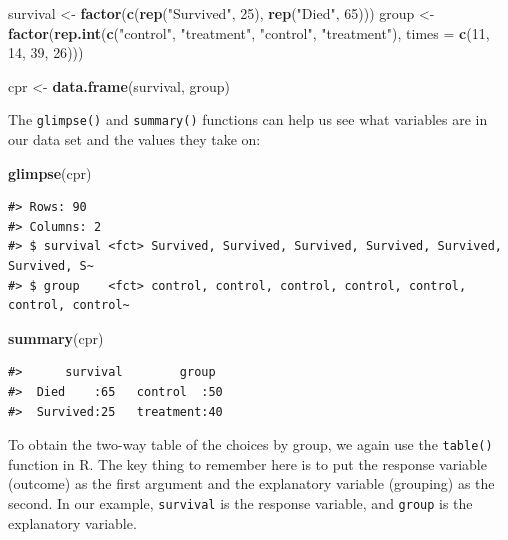 \documentclass[
  10pt,
  openany]{book}
\newenvironment{Shaded}{\begin{snugshade}}{\end{snugshade}}
\newcommand{\AttributeTok}[1]{\textcolor[rgb]{0.13,0.29,0.53}{#1}}
\newcommand{\DecValTok}[1]{\textcolor[rgb]{0.00,0.00,0.81}{#1}}
\newcommand{\FunctionTok}[1]{\textcolor[rgb]{0.13,0.29,0.53}{\textbf{#1}}}
\newcommand{\NormalTok}[1]{#1}
\newcommand{\OtherTok}[1]{\textcolor[rgb]{0.56,0.35,0.01}{#1}}
\newcommand{\StringTok}[1]{\textcolor[rgb]{0.31,0.60,0.02}{#1}}
\theoremstyle{definition}
\theoremstyle{definition}
\theoremstyle{definition}
\theoremstyle{definition}
\theoremstyle{remark}
\begin{document}
\begin{Shaded}
\begin{Highlighting}[]
\NormalTok{survival }\OtherTok{\textless{}{-}} \FunctionTok{factor}\NormalTok{(}\FunctionTok{c}\NormalTok{(}\FunctionTok{rep}\NormalTok{(}\StringTok{"Survived"}\NormalTok{, }\DecValTok{25}\NormalTok{), }\FunctionTok{rep}\NormalTok{(}\StringTok{"Died"}\NormalTok{, }\DecValTok{65}\NormalTok{)))}
\NormalTok{group }\OtherTok{\textless{}{-}} \FunctionTok{factor}\NormalTok{(}\FunctionTok{rep.int}\NormalTok{(}\FunctionTok{c}\NormalTok{(}\StringTok{"control"}\NormalTok{, }\StringTok{"treatment"}\NormalTok{, }\StringTok{"control"}\NormalTok{, }\StringTok{"treatment"}\NormalTok{), }\AttributeTok{times =} \FunctionTok{c}\NormalTok{(}\DecValTok{11}\NormalTok{, }\DecValTok{14}\NormalTok{, }\DecValTok{39}\NormalTok{, }\DecValTok{26}\NormalTok{)))}

\NormalTok{cpr }\OtherTok{\textless{}{-}} \FunctionTok{data.frame}\NormalTok{(survival, group)}
\end{Highlighting}
\end{Shaded}

The \texttt{glimpse()} and \texttt{summary()} functions can help us see what variables are in our data set and the values they take on:

\begin{Shaded}
\begin{Highlighting}[]
\FunctionTok{glimpse}\NormalTok{(cpr)}
\end{Highlighting}
\end{Shaded}

\begin{verbatim}
#> Rows: 90
#> Columns: 2
#> $ survival <fct> Survived, Survived, Survived, Survived, Survived, Survived, S~
#> $ group    <fct> control, control, control, control, control, control, control~
\end{verbatim}

\begin{Shaded}
\begin{Highlighting}[]
\FunctionTok{summary}\NormalTok{(cpr)}
\end{Highlighting}
\end{Shaded}

\begin{verbatim}
#>      survival        group   
#>  Died    :65   control  :50  
#>  Survived:25   treatment:40
\end{verbatim}

To obtain the two-way table of the choices by group, we again use the \texttt{table()} function in R. The key thing to remember here is to put the response variable (outcome) as the first argument and the explanatory variable (grouping) as the second. In our example, \texttt{survival} is the response variable, and \texttt{group} is the explanatory variable.
\end{document}
